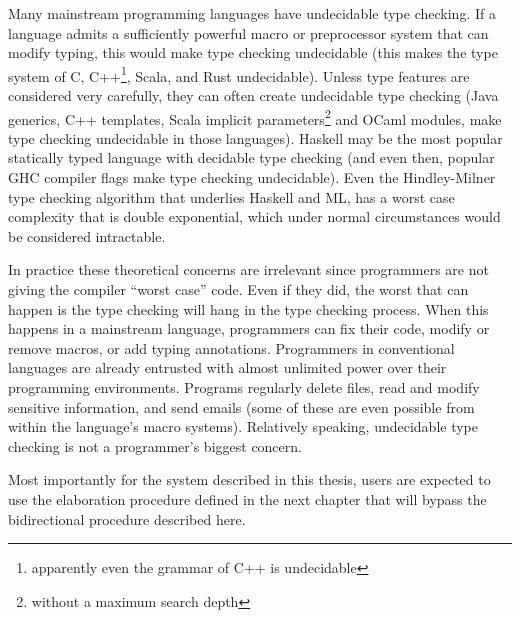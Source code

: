  
Many mainstream programming languages have undecidable type checking.
If a language admits a sufficiently powerful macro or preprocessor system that can modify typing, this would make type checking undecidable (this makes the type system of C, C++\footnote{apparently even the grammar of C++ is undecidable}, Scala, and Rust undecidable).
Unless type features are considered very carefully, they can often create undecidable type checking (Java generics, C++ templates, Scala implicit parameters\footnote{without a maximum search depth} and OCaml modules, make type checking undecidable in those languages).
Haskell may be the most popular statically typed language with decidable type checking (and even then, popular GHC compiler flags make type checking undecidable).
Even the Hindley-Milner type checking algorithm that underlies Haskell and ML, has a worst case complexity that is double exponential, which under normal circumstances would be considered intractable.
 
In practice these theoretical concerns are irrelevant since programmers are not giving the compiler ``worst case'' code.
Even if they did, the worst that can happen is the type checking will hang in the type checking process.
When this happens in a mainstream language, programmers can fix their code, modify or remove macros, or add typing annotations.
Programmers in conventional languages are already entrusted with almost unlimited power over their programming environments.
Programs regularly delete files, read and modify sensitive information, and send emails (some of these are even possible from within the language's macro systems).
Relatively speaking, undecidable type checking is not a programmer's biggest concern.
 
Most importantly for the system described in this thesis, users are expected to use the elaboration procedure defined in the next chapter that will bypass the bidirectional procedure described here.

